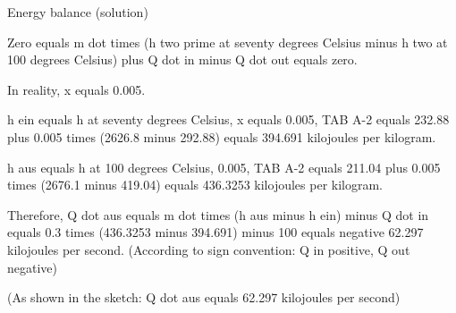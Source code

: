Energy balance (solution)

Zero equals m dot times (h two prime at seventy degrees Celsius minus h two at 100 degrees Celsius) plus Q dot in minus Q dot out equals zero.

In reality, x equals 0.005.

h ein equals h at seventy degrees Celsius, x equals 0.005, TAB A-2 equals 232.88 plus 0.005 times (2626.8 minus 292.88) equals 394.691 kilojoules per kilogram.

h aus equals h at 100 degrees Celsius, 0.005, TAB A-2 equals 211.04 plus 0.005 times (2676.1 minus 419.04) equals 436.3253 kilojoules per kilogram.

Therefore, Q dot aus equals m dot times (h aus minus h ein) minus Q dot in equals 0.3 times (436.3253 minus 394.691) minus 100 equals negative 62.297 kilojoules per second. (According to sign convention: Q in positive, Q out negative)

(As shown in the sketch: Q dot aus equals 62.297 kilojoules per second)